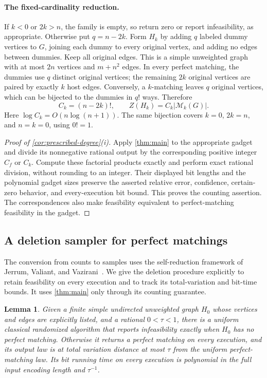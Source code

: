 \documentclass[11pt]{article}
\newtheorem{lemma}[theorem]{Lemma}
\theoremstyle{definition}
\theoremstyle{remark}
\numberwithin{equation}{section}
\begin{document}
\paragraph{The fixed-cardinality reduction.}
If $k<0$ or $2k>n$, the family is empty, so return zero or report
infeasibility, as appropriate. Otherwise put $q=n-2k$. Form $H_k$
by adding $q$ labeled dummy vertices to $G$, joining each dummy to every
original vertex, and adding no edges between dummies. Keep all original
edges. This is a simple unweighted graph with at most $2n$ vertices and
$m+n^2$ edges. In every perfect matching, the dummies use $q$ distinct
original vertices; the remaining $2k$ original vertices are paired by
exactly $k$ host edges. Conversely, a $k$-matching leaves $q$ original
vertices, which can be bijected to the dummies in $q!$ ways. Therefore
\begin{equation}\label{eq:cardinality-fibre}
 C_k=(n-2k)!,\qquad Z(H_k)=C_k|\mathcal M_k(G)|.
\end{equation}
Here $\log C_k=O(n\log(n+1))$. The same bijection covers $k=0$, $2k=n$,
and $n=k=0$, using $0!=1$.

\begin{proof}[Proof of \cref{cor:prescribed-degree}\textup{(i)}]
Apply \cref{thm:main} to the appropriate gadget and divide its nonnegative
rational output by the corresponding positive integer $C_f$ or $C_k$.
Compute these factorial products exactly and perform exact rational
division, without rounding to an integer. Their displayed bit lengths and
the polynomial gadget sizes preserve the asserted relative error,
confidence, certain-zero behavior, and every-execution bit bound. This
proves the counting assertion. The correspondences also make feasibility
equivalent to perfect-matching feasibility in the gadget.
\end{proof}

\subsection{A deletion sampler for perfect matchings}

The conversion from counts to samples uses the self-reduction framework
of Jerrum, Valiant, and Vazirani~\cite[Section~6]{JerrumValiantVazirani1986}.
We give the deletion procedure explicitly to retain feasibility on every
execution and to track its total-variation and bit-time bounds. It uses
\cref{thm:main} only through its counting guarantee.

\begin{lemma}\label{lem:deletion-sampler}
Given a finite simple undirected unweighted graph $H_0$ whose vertices
and edges are explicitly listed, and a rational $0<\tau<1$, there is a
uniform classical randomized algorithm that reports infeasibility exactly
when $H_0$ has no perfect matching. Otherwise it returns a perfect
matching on every execution, and its output law is at total variation
distance at most $\tau$ from the uniform perfect-matching law. Its bit
running time on every execution is polynomial in the full input encoding
length and $\tau^{-1}$.
\end{lemma}
\end{document}
